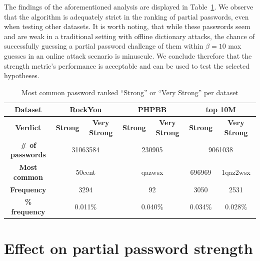   The findings of the aforementioned analysis are displayed in Table~\ref{tab:str_correct}. We observe that the algorithm is adequately strict in the ranking of partial passwords, even when testing other datasets. It is worth noting, that while these passwords seem and are weak in a traditional setting with offline dictionary attacks, the chance of successfully guessing a partial password challenge of them within $\beta = 10$ max guesses in an online attack scenario is minuscule. We conclude therefore that the strength metric's performance is acceptable and can be used to test the selected hypotheses.

  \begin{table}[htpb]
    \centering
    \small
    \hspace*{-1.5cm}
    \begin{tabular}{|c||c|c|c|c|c|c|}
      \hline
      \textbf{Dataset} & \multicolumn{2}{|c|}{\textbf{RockYou}} & \multicolumn{2}{|c|}{\textbf{PHPBB}} & \multicolumn{2}{|c|}{\textbf{top 10M}} \\
      \hline
      \textbf{Verdict} & \textbf{Strong} & \textbf{Very Strong} & \textbf{Strong} & \textbf{Very Strong} & \textbf{Strong} & \textbf{Very Strong} \\
      \hline
      \textbf{\# of passwords} & \multicolumn{2}{|c|}{31063584} & \multicolumn{2}{|c|}{230905} & \multicolumn{2}{|c|}{9061038} \\ \hline
      \textbf{Most common} & \multicolumn{2}{|c|}{50cent} & \multicolumn{2}{|c|}{qazwsx} & 696969 & 1qaz2wsx \\ \hline
      \textbf{Frequency} & \multicolumn{2}{|c|}{3294} & \multicolumn{2}{|c|}{92} & 3050 & 2531 \\ \hline
      \textbf{\% frequency} & \multicolumn{2}{|c|}{0.011\%} & \multicolumn{2}{|c|}{0.040\%} & 0.034\% & 0.028\% \\ \hline
    \end{tabular}
    \caption{Most common password ranked ``Strong'' or ``Very Strong'' per dataset}
    \label{tab:str_correct}
  \end{table}


\section{Effect on partial password strength}
  \label{sec:usability}

